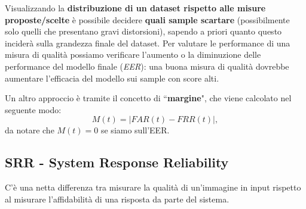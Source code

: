 \documentclass{article}
\begin{document}
Visualizzando la \textbf{distribuzione di un dataset rispetto alle misure proposte/scelte} è possibile decidere \textbf{quali sample scartare} (possibilmente solo quelli che presentano gravi distorsioni), sapendo a priori quanto questo inciderà sulla grandezza finale del dataset. Per valutare le performance di una misura di qualità possiamo verificare l'aumento o la diminuzione delle performance del modello finale (\textit{EER}): una buona misura di qualità dovrebbe aumentare l'efficacia del modello sui sample con score alti.

\begin{figure}[H]
    \centering
    \caption{}
    \label{fig:qm}
\end{figure}

Un altro approccio è tramite il concetto di ``\textbf{margine}", che viene calcolato nel seguente modo:
$$M(t) = |FAR(t) - FRR(t)|,$$ da notare che $M(t)=0$ se siamo sull'EER.

\subsection{SRR - System Response Reliability}
C'è una netta differenza tra misurare la qualità di un'immagine in input rispetto al misurare l'affidabilità di una risposta da parte del sistema.
\end{document}
